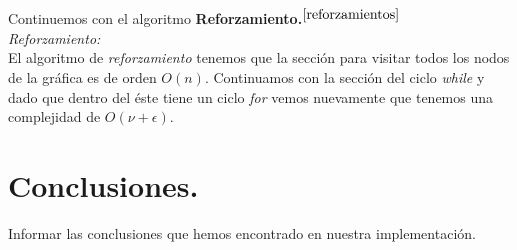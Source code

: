 \documentclass[12pt]{article}
\begin{document}
Continuemos con el algoritmo \textbf{Reforzamiento.}$^{\ref{reforzamientos} }$\\
\textit{Reforzamiento:}\\
El algoritmo de \textit{reforzamiento} tenemos que la secci\'on para visitar todos los nodos de la gr\'afica es de orden $O(n)$.
Continuamos con la secci\'on del ciclo \textit{while} y dado que dentro del \'este tiene un ciclo \textit{for} vemos nuevamente que tenemos una complejidad de $O(\nu + \epsilon)$.\\





\section{Conclusiones.}
Informar las conclusiones que hemos encontrado en nuestra implementaci\'on.\\


\newpage

	
\nocite{*}
{}
\end{document}
